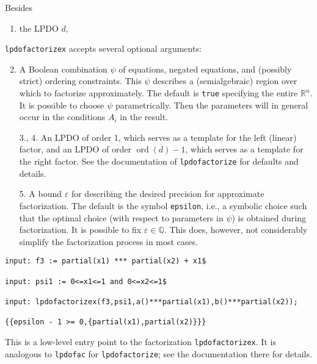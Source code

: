 Besides
\begin{enumerate}
\item the LPDO $d$,
\end{enumerate}
\texttt{lpdofactorizex} accepts several optional arguments:
\begin{enumerate}
\setcounter{enumi}{1}
\item A Boolean combination $\psi$ of equations, negated equations, and
  (possibly strict) ordering constraints. This $\psi$ describes a
  (semialgebraic) region over which to factorize approximately. The
  default is \texttt{true} specifying the entire $\mathbb{R}^n$. It is possible
  to choose $\psi$ parametrically. Then the parameters will in general
  occur in the conditions $A_i$ in the result.
\item[3., 4.] An LPDO of order 1, which serves as a template for the left
  (linear) factor, and an LPDO of order $\operatorname{ord}(d)-1$, which
  serves as a template for the right factor. See the documentation of
  \texttt{lpdofactorize} for defaults and details.
\item[5.] A bound $\varepsilon$ for describing the desired precision for
  approximate factorization. The default is the symbol \texttt{epsilon},
  i.e., a symbolic choice such that the optimal choice (with respect to
  parameters in $\psi$) is obtained during factorization. It is possible
  to fix $\varepsilon\in\mathbb{Q}$. This does, however, not considerably
  simplify the factorization process in most cases.
\end{enumerate}

\begin{footnotesize}
\begin{verbatim}
input: f3 := partial(x1) *** partial(x2) + x1$

input: psi1 := 0<=x1<=1 and 0<=x2<=1$

input: lpdofactorizex(f3,psi1,a()***partial(x1),b()***partial(x2));

{{epsilon - 1 >= 0,{partial(x1),partial(x2)}}}
\end{verbatim}
\end{footnotesize}

This is a low-level entry point to the factorization
\texttt{lpdofactorizex}. It is analogous to \texttt{lpdofac} for
\texttt{lpdofactorize}; see the documentation there for details.



